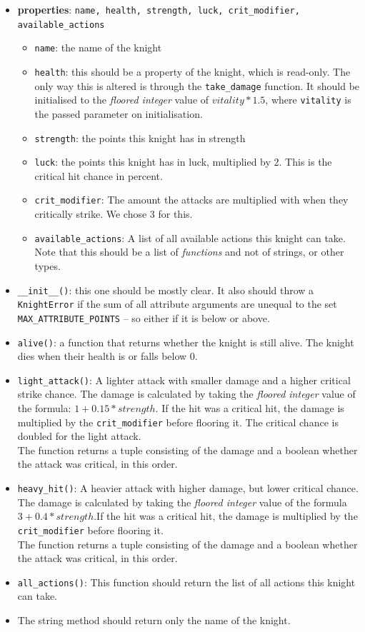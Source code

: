 \begin{itemize}
	\item \textbf{properties}: \texttt{name, health, strength, luck, crit\_modifier, available\_actions}
		\begin{itemize}
			\item \texttt{name}: the name of the knight
			\item \texttt{health}: this should be a property of the knight, which is read-only.
				The only way this is altered is through the \texttt{take\_damage}
				function. It should be initialised to the \textit{floored integer} value of
				$vitality * 1.5$, where \texttt{vitality} is the passed parameter on initialisation.
			\item \texttt{strength}: the points this knight has in strength
			\item \texttt{luck}: the points this knight has in luck, multiplied by 2.
				This is the critical hit chance in percent.
			\item \texttt{crit\_modifier}: The amount the attacks are multiplied with when they
				critically strike. We chose 3 for this.
			\item \texttt{available\_actions}: A list of all available actions this knight can take.
				Note that this should be a list of \textit{functions} and not of strings, or other
				types.
		\end{itemize}
	\item \texttt{\_\_init\_\_()}: this one should be mostly clear. It also should
		throw a \texttt{KnightError} if the sum of all attribute arguments are
		unequal to the set \texttt{MAX\_ATTRIBUTE\_POINTS} -- so either if it is
		below or above.
	\item \texttt{alive()}: a function that returns whether the knight is
		still alive. The knight dies when their health is or falls below 0.
	\item \texttt{light\_attack()}: A lighter attack with smaller damage and a higher
		critical strike chance. The damage is calculated by taking the \textit{floored integer}
		value of the formula: $1 + 0.15 * strength$. If the hit was a critical hit, the
		damage is multiplied by the \texttt{crit\_modifier} before flooring it. The critical
		chance is doubled for the light attack.\\
		The function returns a tuple consisting of the damage and a boolean whether the attack
		was critical, in this order.
	\item \texttt{heavy\_hit()}: A heavier attack with higher damage, but lower critical chance.
		The damage is calculated by taking the \textit{floored integer} value of the formula
		$3 + 0.4 * strength$.If the hit was a critical hit, the damage is multiplied by
		the \texttt{crit\_modifier} before flooring it.\\
		The function returns a tuple consisting of the damage and a boolean whether the attack
		was critical, in this order.
	\item \texttt{all\_actions()}: This function should return the list of all actions this knight
		can take.
	\item The string method should return only the name of the knight.
\end{itemize}

